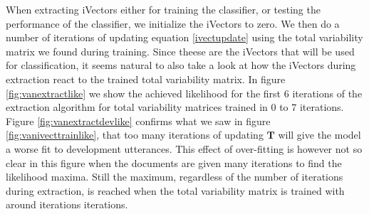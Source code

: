 When extracting iVectors either for training the classifier, or testing the performance of the classifier, we initialize the iVectors to zero. We then do a number of iterations of updating equation \ref{ivectupdate} using the total variability matrix we found during training. Since theese are the iVectors that will be used for classification, it seems natural to also take a look at how the iVectors during extraction react to the trained total variability matrix. In figure \ref{fig:vanextractlike} we show the achieved likelihood for the first 6 iterations of the extraction algorithm for total variability matrices trained in 0 to 7 iterations. Figure \ref{fig:vanextractdevlike} confirms what we saw in figure \ref{fig:vanivecttrainlike}, that too many iterations of updating $\mathbf{T}$ will give the model a worse fit to development utterances. This effect of over-fitting is however not so clear in this figure when the documents are given many iterations to find the likelihood maxima. Still the maximum, regardless of the number of iterations during extraction, is reached when the total variability matrix is trained with around iterations iterations.

